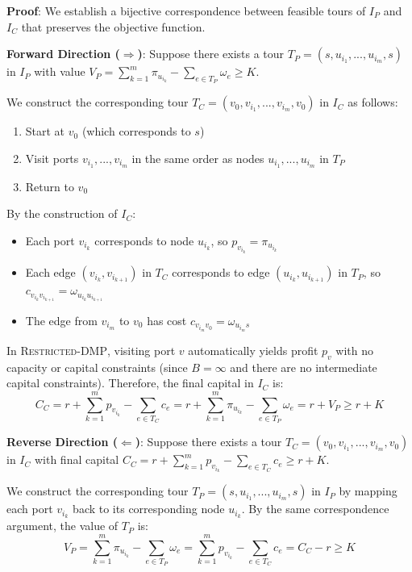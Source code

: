 \documentclass[12pt]{article}
\begin{document}
\textbf{Proof}: We establish a bijective correspondence between feasible tours of $I_P$ and $I_C$ that preserves the objective function.

\textbf{Forward Direction ($\Rightarrow$)}: Suppose there exists a tour $T_P = (s, u_{i_1}, ..., u_{i_m}, s)$ in $I_P$ with value $V_P = \sum_{k=1}^{m} \pi_{u_{i_k}} - \sum_{e \in T_P} \omega_e \geq K$.

We construct the corresponding tour $T_C = (v_0, v_{i_1}, ..., v_{i_m}, v_0)$ in $I_C$ as follows:
\begin{enumerate}
    \item Start at $v_0$ (which corresponds to $s$)
    \item Visit ports $v_{i_1}, ..., v_{i_m}$ in the same order as nodes $u_{i_1}, ..., u_{i_m}$ in $T_P$
    \item Return to $v_0$
\end{enumerate}

By the construction of $I_C$:
\begin{itemize}
    \item Each port $v_{i_k}$ corresponds to node $u_{i_k}$, so $p_{v_{i_k}} = \pi_{u_{i_k}}$
    \item Each edge $(v_{i_k}, v_{i_{k+1}})$ in $T_C$ corresponds to edge $(u_{i_k}, u_{i_{k+1}})$ in $T_P$, so $c_{v_{i_k} v_{i_{k+1}}} = \omega_{u_{i_k} u_{i_{k+1}}}$
    \item The edge from $v_{i_m}$ to $v_0$ has cost $c_{v_{i_m} v_0} = \omega_{u_{i_m} s}$
\end{itemize}

In \textsc{Restricted-DMP}, visiting port $v$ automatically yields profit $p_v$ with no capacity or capital constraints (since $B = \infty$ and there are no intermediate capital constraints). Therefore, the final capital in $I_C$ is:
$$C_C = r + \sum_{k=1}^{m} p_{v_{i_k}} - \sum_{e \in T_C} c_e = r + \sum_{k=1}^{m} \pi_{u_{i_k}} - \sum_{e \in T_P} \omega_e = r + V_P \geq r + K$$

\textbf{Reverse Direction ($\Leftarrow$)}: Suppose there exists a tour $T_C = (v_0, v_{i_1}, ..., v_{i_m}, v_0)$ in $I_C$ with final capital $C_C = r + \sum_{k=1}^{m} p_{v_{i_k}} - \sum_{e \in T_C} c_e \geq r + K$.

We construct the corresponding tour $T_P = (s, u_{i_1}, ..., u_{i_m}, s)$ in $I_P$ by mapping each port $v_{i_k}$ back to its corresponding node $u_{i_k}$. By the same correspondence argument, the value of $T_P$ is:
$$V_P = \sum_{k=1}^{m} \pi_{u_{i_k}} - \sum_{e \in T_P} \omega_e = \sum_{k=1}^{m} p_{v_{i_k}} - \sum_{e \in T_C} c_e = C_C - r \geq K$$
\end{document}
